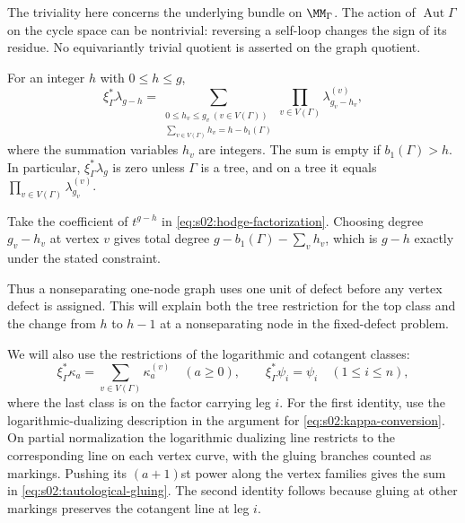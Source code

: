 The triviality here concerns the underlying bundle on $\MM_\Gamma$.
The action of $\operatorname{Aut}\Gamma$ on the cycle space can be
nontrivial: reversing a self-loop changes the sign of its residue.
No equivariantly trivial quotient is asserted on the graph quotient.

\begin{crl}
\label{crl:s02:defect-allocation}
For an integer $h$ with $0\leq h\leq g$,
\begin{equation}
\label{eq:s02:defect-allocation}
\xi_\Gamma^*\lambda_{g-h}
=\sum_{\substack{0\leq h_v\leq g_v\ (v\in V(\Gamma))\\
\sum_{v\in V(\Gamma)}h_v=h-b_1(\Gamma)}}
\prod_{v\in V(\Gamma)}\lambda_{g_v-h_v}^{(v)},
\end{equation}
where the summation variables $h_v$ are integers.  The sum is empty
if $b_1(\Gamma)>h$.  In particular, $\xi_\Gamma^*\lambda_g$ is zero
unless $\Gamma$ is a tree, and on a tree it equals
$\prod_{v\in V(\Gamma)}\lambda_{g_v}^{(v)}$.
\end{crl}

\begin{prf}
Take the coefficient of $t^{g-h}$ in
\eqref{eq:s02:hodge-factorization}.  Choosing degree $g_v-h_v$ at
vertex $v$ gives total degree
$g-b_1(\Gamma)-\sum_v h_v$, which is $g-h$ exactly under the stated
constraint.
\end{prf}

Thus a nonseparating one-node graph uses one unit of defect before any
vertex defect is assigned.  This will explain both the tree restriction
for the top class and the change from $h$ to $h-1$ at a nonseparating
node in the fixed-defect problem.

We will also use the restrictions of the logarithmic and cotangent
classes:
\begin{equation}
\label{eq:s02:tautological-gluing}
\xi_\Gamma^*\kappa_a=\sum_{v\in V(\Gamma)}\kappa_a^{(v)}
\quad(a\geq0),
\qquad
\xi_\Gamma^*\psi_i=\psi_i\quad(1\leq i\leq n),
\end{equation}
where the last class is on the factor carrying leg $i$.  For the first
identity, use the logarithmic-dualizing description in the argument for
\eqref{eq:s02:kappa-conversion}.  On partial normalization the
logarithmic dualizing line restricts to the corresponding line on each
vertex curve, with the gluing branches counted as markings.  Pushing
its $(a+1)$st power along the vertex families gives the sum in
\eqref{eq:s02:tautological-gluing}.  The second identity follows because
gluing at other markings preserves the cotangent line at leg $i$.
